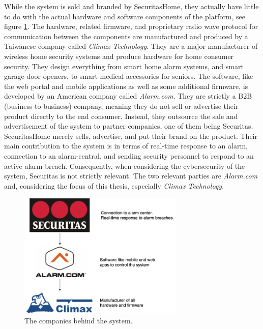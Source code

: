 While the system is sold and branded by SecuritasHome, they actually have little to do with the actual hardware and software components of the platform, see figure \ref{fig:company-structure}. The hardware, related firmware, and proprietary radio wave protocol for communication between the components are manufactured and produced by a Taiwanese company called \textit{Climax Technology}. They are a major manufacturer of wireless home security systems and produce hardware for home consumer security. They design everything from smart home alarm systems, and smart garage door openers, to smart medical accessories for seniors. The software, like the web portal and mobile applications as well as some additional firmware, is developed by an American company called \textit{Alarm.com}. They are strictly a B2B (business to business) company, meaning they do not sell or advertise their product directly to the end consumer. Instead, they outsource the sale and advertisement of the system to partner companies, one of them being Securitas. SecuritasHome merely sells, advertise, and put their brand on the product. Their main contribution to the system is in terms of real-time response to an alarm, connection to an alarm-central, and sending security personnel to respond to an active alarm breach. Consequently, when considering the cybersecurity of the system, Securitas is not strictly relevant. The two relevant parties are \textit{Alarm.com} and, considering the focus of this thesis, especially \textit{Climax Technology}.
\begin{figure}[!ht]
    \centering
    \includegraphics[width=0.7\textwidth]{images/3-system/company-structure.png}
    \caption{The companies behind the system.}
    \label{fig:company-structure}
\end{figure}

